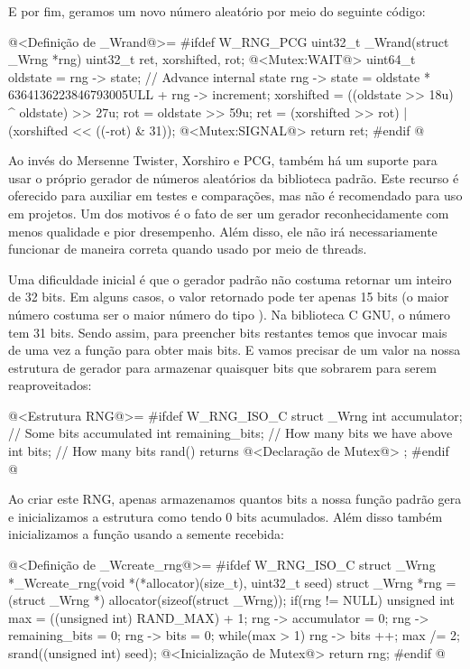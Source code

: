 E por fim, geramos um novo número aleatório por meio do seguinte código:

\iniciocodigo
@<Definição de \_Wrand@>=
#ifdef W_RNG_PCG
uint32_t _Wrand(struct _Wrng *rng){
  uint32_t ret, xorshifted, rot;
  @<Mutex:WAIT@>
  uint64_t oldstate = rng -> state;
  // Advance internal state
  rng -> state = oldstate * 6364136223846793005ULL + rng -> increment;
  xorshifted = ((oldstate >> 18u) ^ oldstate) >> 27u;
  rot = oldstate >> 59u;
  ret = (xorshifted >> rot) | (xorshifted << ((-rot) & 31));
  @<Mutex:SIGNAL@>
  return ret;
}
#endif
@
\fimcodigo


Ao invés do Mersenne Twister, Xorshiro e PCG, também há um suporte
para usar o próprio gerador de números aleatórios da biblioteca
padrão. Este recurso é oferecido para auxiliar em testes e
comparações, mas não é recomendado para uso em projetos. Um dos
motivos é o fato de ser um gerador reconhecidamente com menos
qualidade e pior dresempenho. Além disso, ele não irá necessariamente
funcionar de maneira correta quando usado por meio de threads.

Uma dificuldade inicial é que o gerador padrão não costuma retornar um
inteiro de 32 bits. Em alguns casos, o valor retornado pode ter apenas
15 bits (o maior número costuma ser o maior número do
tipo ). Na biblioteca C GNU, o número tem 31
bits. Sendo assim, para preencher bits restantes temos que invocar
mais de uma vez a função para obter mais bits. E vamos precisar de um
valor na nossa estrutura de gerador para armazenar quaisquer bits que
sobrarem para serem reaproveitados:

\iniciocodigo
@<Estrutura RNG@>=
#ifdef W_RNG_ISO_C
struct _Wrng{
  int accumulator;     // Some bits accumulated
  int remaining_bits;  // How many bits we have above
  int bits;            // How many bits rand() returns
  @<Declaração de Mutex@>
};
#endif
@
\fimcodigo

Ao criar este RNG, apenas armazenamos quantos bits a nossa função
padrão gera e inicializamos a estrutura como tendo 0 bits
acumulados. Além disso também inicializamos a função usando a semente
recebida:

\iniciocodigo
@<Definição de \_Wcreate\_rng@>=
#ifdef W_RNG_ISO_C
struct _Wrng *_Wcreate_rng(void *(*allocator)(size_t), uint32_t seed){
  struct _Wrng *rng = (struct _Wrng *) allocator(sizeof(struct _Wrng));
  if(rng != NULL){
    unsigned int max = ((unsigned int) RAND_MAX) + 1;
    rng -> accumulator = 0;
    rng -> remaining_bits = 0;
    rng -> bits = 0;
    while(max > 1){
      rng -> bits ++;
      max /= 2;
    }
    srand((unsigned int) seed);
    @<Inicialização de Mutex@>
  }
  return rng;
}
#endif
@
\fimcodigo

